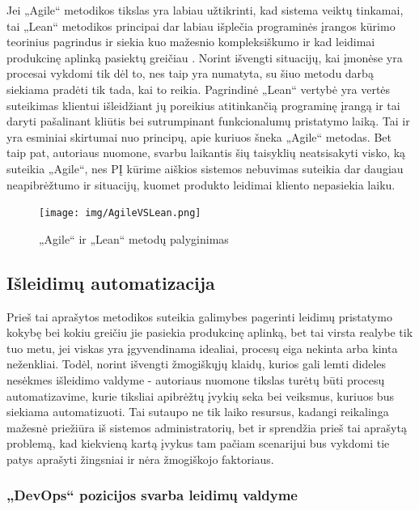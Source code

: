 \documentclass{VUMIFPSkursinis}
\begin{document}
Jei „Agile“ metodikos tikslas yra labiau užtikrinti, kad sistema veiktų tinkamai, tai „Lean“ metodikos principai dar labiau išplečia programinės įrangos kūrimo teorinius pagrindus ir siekia kuo mažesnio kompleksiškumo ir kad leidimai produkcinę aplinką pasiektų greičiau \cite{SaltSestas}. Norint išvengti situacijų, kai įmonėse yra procesai vykdomi tik dėl to, nes taip yra numatyta, su šiuo metodu darbą siekiama pradėti tik tada, kai to reikia. Pagrindinė „Lean“ vertybė yra vertės suteikimas klientui išleidžiant jų poreikius atitinkančią programinę įrangą ir tai daryti pašalinant kliūtis bei sutrumpinant funkcionalumų pristatymo laiką. Tai ir yra esminiai skirtumai nuo principų, apie kuriuos šneka „Agile“ metodas. Bet taip pat, autoriaus nuomone, svarbu laikantis šių taisyklių neatsisakyti visko, ką suteikia „Agile“, nes PĮ kūrime aiškios sistemos nebuvimas suteikia dar daugiau neapibrėžtumo ir situacijų, kuomet produkto leidimai kliento nepasiekia laiku.

\begin{figure}[H]
    \centering
    \texttt{[image: img/AgileVSLean.png]}
    \caption{„Agile“ ir „Lean“ metodų palyginimas}
    \label{img:mlp}
\end{figure}

\subsection{Išleidimų automatizacija}

Prieš tai aprašytos metodikos suteikia galimybes pagerinti leidimų pristatymo kokybę bei kokiu greičiu jie pasiekia produkcinę aplinką, bet tai virsta realybe tik tuo metu, jei viskas yra įgyvendinama idealiai, procesų eiga nekinta arba kinta neženkliai. Todėl, norint išvengti žmogiškųjų klaidų, kurios gali lemti dideles nesėkmes išleidimo valdyme - autoriaus nuomone tikslas turėtų būti procesų automatizavime, kurie tiksliai apibrėžtų įvykių seka bei veiksmus, kuriuos bus siekiama automatizuoti. Tai sutaupo ne tik laiko resursus, kadangi reikalinga mažesnė priežiūra iš sistemos administratorių, bet ir sprendžia prieš tai aprašytą problemą, kad kiekvieną kartą įvykus tam pačiam scenarijui bus vykdomi tie patys aprašyti žingsniai ir nėra žmogiškojo faktoriaus.

    \subsubsection{„DevOps“ pozicijos svarba leidimų valdyme}
\end{document}

